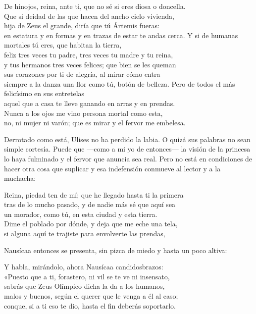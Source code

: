 \begin{versocita}
De hinojos, reina, ante ti, que no sé si eres diosa o doncella.\\
Que si deidad de las que hacen del ancho cielo vivienda,\\
hija de Zeus el grande, diría que tú Ártemis fueras:\\
en estatura y en formas y en trazas de estar te andas cerca.
\stanzabreak
Y si de humanas mortales tú eres, que habitan la tierra,\\
feliz tres veces tu padre, tres veces tu madre y tu reina,\\
y tus hermanos tres veces felices; que bien se les queman\\
sus corazones por ti de alegría, al mirar cómo entra\\
siempre a la danza una flor como tú, botón de belleza.
\stanzabreak
Pero de todos el más felicísimo en sus entretelas\\
aquel que a casa te lleve ganando en arras y en prendas.\\
Nunca a los ojos me vino persona mortal como esta,\\
no, ni mujer ni varón; que es mirar y el fervor me embelesa.
\end{versocita}

Derrotado como está, Ulises no ha perdido la labia. O quizá sus palabras no sean simple cortesía. Puede que ---como a mi yo de entonces--- la visión de la princesa lo haya fulminado y el fervor que anuncia sea real. Pero no está en condiciones de hacer otra cosa que suplicar y esa indefensión conmueve al lector y a la muchacha:

\begin{versocita}
Reina, piedad ten de mí; que he llegado hasta ti la primera\\
tras de lo mucho pasado, y de nadie más sé que aquí sea\\
un morador, como tú, en esta ciudad y esta tierra.\\
Dime el poblado por dónde, y deja que me eche una tela,\\
si alguna aquí te trajiste para envolverte las prendas,
\end{versocita}

Nausícaa entonces se presenta, sin pizca de miedo y hasta un poco altiva:

\begin{versocita}
Y habla, mirándolo, ahora Nausícaa candidosbrazos:\\
«Puesto que a ti, forastero, ni vil se te ve ni insensato,\\
sabrás que Zeus Olímpico dicha la da a los humanos,\\
malos y buenos, según el querer que le venga a él al caso;\\
conque, si a ti eso te dio, hasta el fin deberás soportarlo.
\end{versocita}

